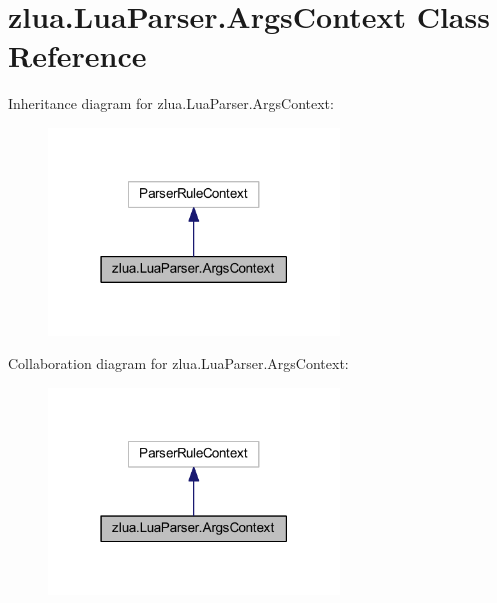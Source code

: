 \hypertarget{classzlua_1_1_lua_parser_1_1_args_context}{}\section{zlua.\+Lua\+Parser.\+Args\+Context Class Reference}
\label{classzlua_1_1_lua_parser_1_1_args_context}


Inheritance diagram for zlua.\+Lua\+Parser.\+Args\+Context\+:
\nopagebreak
\begin{figure}[H]
\begin{center}
\leavevmode
\includegraphics[width=219pt]{classzlua_1_1_lua_parser_1_1_args_context__inherit__graph}
\end{center}
\end{figure}


Collaboration diagram for zlua.\+Lua\+Parser.\+Args\+Context\+:
\nopagebreak
\begin{figure}[H]
\begin{center}
\leavevmode
\includegraphics[width=219pt]{classzlua_1_1_lua_parser_1_1_args_context__coll__graph}
\end{center}
\end{figure}
